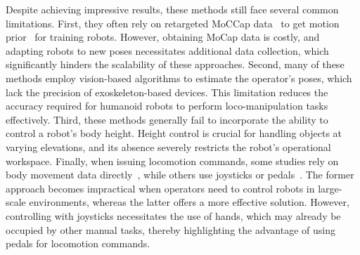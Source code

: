 Despite achieving impressive results, these methods still face several common limitations. First, they often rely on retargeted MoCCap data~\cite{AMASS} to get motion prior~\cite{luo2023universal} for training robots. However, obtaining MoCap data is costly, and adapting robots to new poses necessitates additional data collection, which significantly hinders the scalability of these approaches. Second, many of these methods employ vision-based algorithms to estimate the operator's poses, which lack the precision of exoskeleton-based devices. This limitation reduces the accuracy required for humanoid robots to perform loco-manipulation tasks effectively. Third, these methods generally fail to incorporate the ability to control a robot's body height. Height control is crucial for handling objects at varying elevations, and its absence severely restricts the robot's operational workspace. Finally, when issuing locomotion commands, some studies rely on body movement data directly~\cite{cheng2024express,fu2024humanplus,he2024learning,he2024omnih2o}, while others use joysticks or pedals~\cite{lu2024pmp}. The former approach becomes impractical when operators need to control robots in large-scale environments, whereas the latter offers a more effective solution. However, controlling with joysticks necessitates the use of hands, which may already be occupied by other manual tasks, thereby highlighting the advantage of using pedals for locomotion commands.
